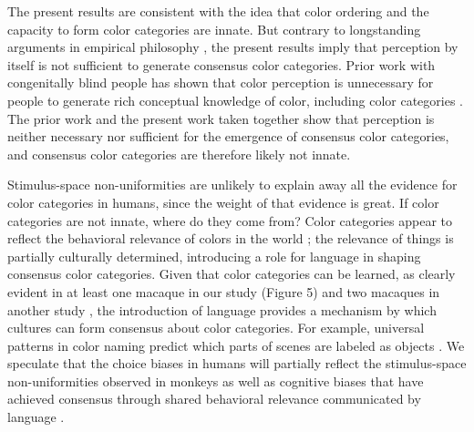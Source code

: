 The present results are consistent with the idea that color ordering and the capacity to form color categories are innate. But contrary to longstanding arguments in empirical philosophy \citep{RN18743}, the present results imply that perception by itself is not sufficient to generate consensus color categories. Prior work with congenitally blind people has shown that color perception is unnecessary for people to generate rich conceptual knowledge of color, including color categories \citep{RN18700}. The prior work and the present work taken together show that perception is neither necessary nor sufficient for the emergence of consensus color categories, and consensus color categories are therefore likely not innate. 

Stimulus-space non-uniformities are unlikely to explain away all the evidence for color categories in humans, since the weight of that evidence is great. If color categories are not innate, where do they come from? Color categories appear to reflect the behavioral relevance of colors in the world \citep{RN18616,gibson_color_2017}; the relevance of things is partially culturally determined, introducing a role for language in shaping consensus color categories. Given that color categories can be learned, as clearly evident in at least one macaque in our study (Figure 5) and two macaques in another study \citep{panichello_error-correcting_2019}, the introduction of language provides a mechanism by which cultures can form consensus about color categories. For example, universal patterns in color naming predict which parts of scenes are labeled as objects \citep{gibson_color_2017}. We speculate that the choice biases in humans will partially reflect the stimulus-space non-uniformities observed in monkeys as well as cognitive biases that have achieved consensus through shared behavioral relevance communicated by language \citep{RN18511,RN18514,RN18602}. 
